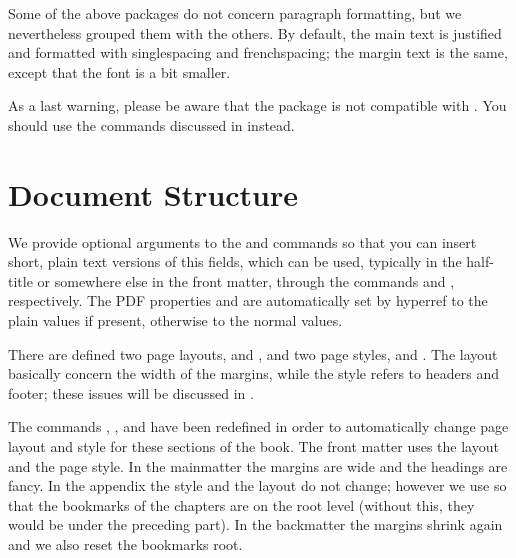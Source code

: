 Some of the above packages do not concern paragraph formatting, but we 
nevertheless grouped them with the others. By default, the main text is 
justified and formatted with singlespacing and frenchspacing; the margin 
text is the same, except that the font is a bit smaller.

As a last warning, please be aware that the  package 
is not compatible with . You should use the commands 
discussed in  instead.

\section{Document Structure}

We provide optional arguments to the  and 
 commands so that you can insert short, plain text 
versions of this fields, which can be used, typically in the half-title 
or somewhere else in the front matter, through the commands 
 and , respectively. The PDF 
properties  and  are automatically 
set by hyperref to the plain values if present, otherwise to the normal 
values.

There are defined two page layouts,  and , 
and two page styles,  and . The layout 
basically concern the width of the margins, while the style refers to 
headers and footer; these issues will be 
discussed in . 

The commands , , and 
 have been redefined in order to automatically 
change page layout and style for these sections of the book. The front 
matter uses the  layout and the  page 
style. In the mainmatter the margins are wide and the headings are 
fancy. In the appendix the style and the layout do not change; however 
we use  so that the bookmarks of 
the chapters are on the root level (without this, they would be under 
the preceding part). In the backmatter the margins shrink again and we 
also reset the bookmarks root.
